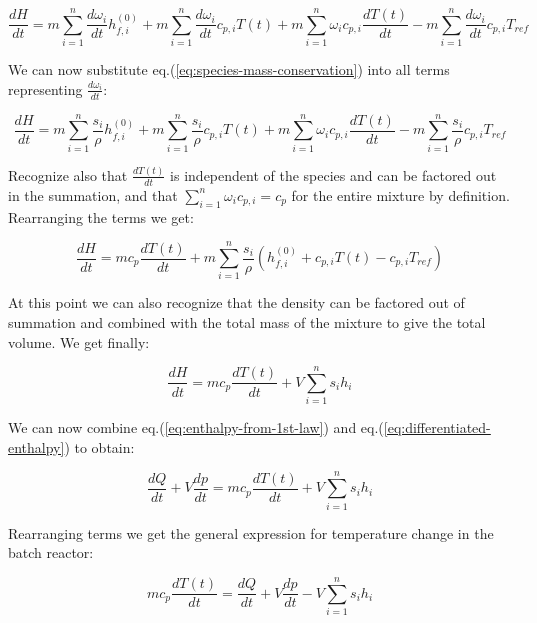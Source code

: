 \documentclass[10pt]{article}
\begin{document}
\begin{equation*}
\frac{dH}{dt} = m \sum_{i=1}^n  \frac{d \omega_i}{dt}  h_{f,i}^{(0)}  + m \sum_{i=1}^n \frac{d \omega_i}{dt} c_{p,i} T(t) + m \sum_{i=1}^n \omega_i c_{p,i} \frac{d T(t)}{dt}  - m \sum_{i=1}^n \frac{d \omega_i}{dt} c_{p,i} T_{ref}
\end{equation*}

We can now substitute eq.(\ref{eq:species-mass-conservation}) into all terms  representing $\frac{d \omega_i}{dt}$:

\begin{equation*}
\frac{dH}{dt} = m \sum_{i=1}^n  \frac{s_i}{\rho}  h_{f,i}^{(0)}  + m \sum_{i=1}^n \frac{s_i}{\rho} c_{p,i} T(t) + m \sum_{i=1}^n \omega_i c_{p,i} \frac{d T(t)}{dt}  - m \sum_{i=1}^n \frac{s_i}{\rho} c_{p,i} T_{ref}
\end{equation*}

Recognize also that $\frac{d T(t)}{dt}$ is independent of the species and can be factored out in the summation, and that $\sum_{i=1}^n \omega_i c_{p,i} = c_p$ for the entire mixture by definition. Rearranging the terms we get:

\begin{equation*}
\frac{dH}{dt} = m c_{p} \frac{d T(t)}{dt} + m \sum_{i=1}^n  \frac{s_i}{\rho}  ( h_{f,i}^{(0)} + c_{p,i} T(t)  - c_{p,i} T_{ref})
\end{equation*}

At this point we can also recognize that the density can be factored out of summation and combined with the total mass of the mixture to give the total volume. We get finally:

\begin{equation} \label{eq:differentiated-enthalpy}
\frac{dH}{dt} = m c_{p} \frac{d T(t)}{dt} + V \sum_{i=1}^n  s_i  h_i
\end{equation}

We can now combine eq.(\ref{eq:enthalpy-from-1st-law}) and eq.(\ref{eq:differentiated-enthalpy}) to obtain:

\begin{equation} 
\frac{dQ}{dt} + V \frac{dp}{dt} = m c_{p} \frac{d T(t)}{dt} + V \sum_{i=1}^n  s_i h_i
\end{equation}

Rearranging terms we get the general expression for temperature change in the batch reactor:

\begin{equation} \label{eq:bath-reactor-energy}
m c_{p} \frac{d T(t)}{dt}  = \frac{dQ}{dt} + V \frac{dp}{dt} - V \sum_{i=1}^n  s_i  h_i 
\end{equation}
\end{document}
